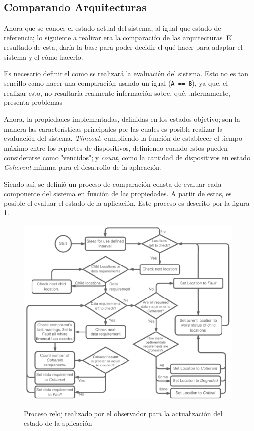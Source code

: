 \subsection{Comparando Arquitecturas} \label{sec:comparando}

Ahora que se conoce el estado actual del sistema, al igual que estado de referencia; lo siguiente a realizar era la comparación de las arquitecturas. El resultado de esta, daría la base para poder decidir el qué hacer para adaptar el sistema y el cómo hacerlo.

Es necesario definir el como se realizará la evaluación del sistema. Esto no es tan sencillo como hacer una comparación usando un igual (\texttt{A == B}), ya que, el realizar esto, no resultaría realmente información sobre, qué, internamente, presenta problemas.

Ahora, la propiedades implementadas, definidas en los estados objetivo; son la manera las características principales por las cuales es posible realizar la evaluación del sistema. \textit{Timeout}, cumpliendo la función de establecer el tiempo máximo entre los reportes de dispositivos, definiendo cuando estos pueden considerarse como "vencidos"; y \textit{count}, como la cantidad de dispositivos en estado \textit{Coherent} mínima para el desarrollo de la aplicación.

Siendo así, se definió un proceso de comparación consta de evaluar cada componente del sistema en función de las propiedades. A partir de estas, es posible el evaluar el estado de la aplicación. Este proceso es descrito por la figura \ref{fig:LookerProcessClock}.

\begin{figure}[ht]
    \centering
    \caption{Proceso reloj realizado por el observador para la actualización del estado de la aplicación} 
    \includegraphics[width=0.85\linewidth]{images/LookerProcessClock.pdf}
    \label{fig:LookerProcessClock}
\end{figure} 

